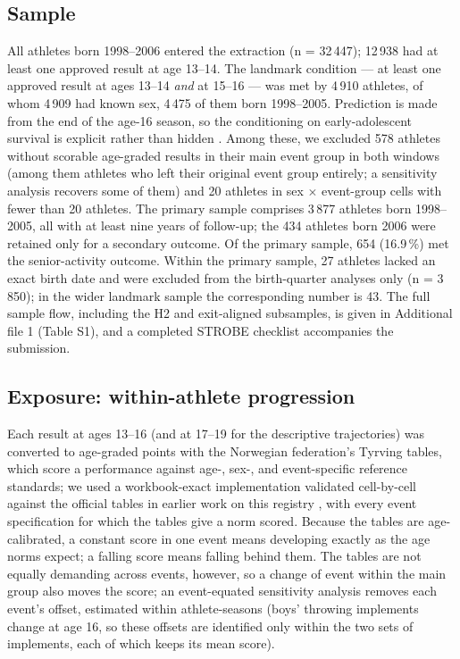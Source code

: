 \documentclass[12pt,a4paper]{article}
\begin{document}
\subsection{Sample}

All athletes born 1998--2006 entered the extraction (n = 32\,447); 12\,938 had at least one approved result at age 13--14. The landmark condition --- at least one approved result at ages 13--14 \emph{and} at 15--16 --- was met by 4\,910 athletes, of whom 4\,909 had known sex, 4\,475 of them born 1998--2005. Prediction is made from the end of the age-16 season, so the conditioning on early-adolescent survival is explicit rather than hidden \cite{anderson1983}. Among these, we excluded 578 athletes without scorable age-graded results in their main event group in both windows (among them athletes who left their original event group entirely; a sensitivity analysis recovers some of them) and 20 athletes in sex $\times$ event-group cells with fewer than 20 athletes. The primary sample comprises 3\,877 athletes born 1998--2005, all with at least nine years of follow-up; the 434 athletes born 2006 were retained only for a secondary outcome. Of the primary sample, 654 (16.9\,\%) met the senior-activity outcome. Within the primary sample, 27 athletes lacked an exact birth date and were excluded from the birth-quarter analyses only (n = 3\,850); in the wider landmark sample the corresponding number is 43. The full sample flow, including the H2 and exit-aligned subsamples, is given in Additional file 1 (Table S1), and a completed STROBE checklist accompanies the submission.

\subsection{Exposure: within-athlete progression}

Each result at ages 13--16 (and at 17--19 for the descriptive trajectories) was converted to age-graded points with the Norwegian federation's Tyrving tables, which score a performance against age-, sex-, and event-specific reference standards; we used a workbook-exact implementation validated cell-by-cell against the official tables in earlier work on this registry \cite{guttormsen2026dropout,nfif2014}, with every event specification for which the tables give a norm scored. Because the tables are age-calibrated, a constant score in one event means developing exactly as the age norms expect; a falling score means falling behind them. The tables are not equally demanding across events, however, so a change of event within the main group also moves the score; an event-equated sensitivity analysis removes each event's offset, estimated within athlete-seasons (boys' throwing implements change at age 16, so these offsets are identified only within the two sets of implements, each of which keeps its mean score).
\end{document}
